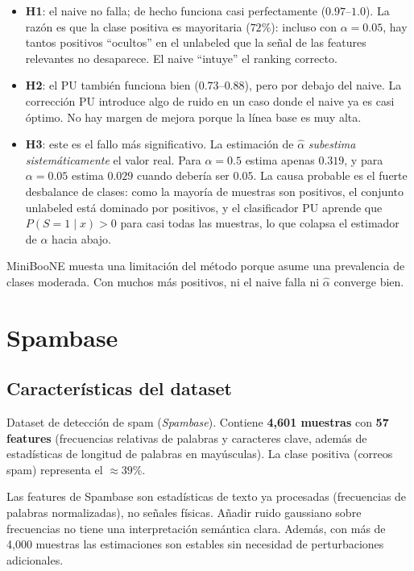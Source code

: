 \documentclass[a4paper,11pt]{article}
\begin{document}
\begin{itemize}
    \item \textbf{H1}: el naive no falla; de hecho funciona casi perfectamente ($0.97$--$1.0$). La razón es que la clase positiva es mayoritaria ($72\%$): incluso con $\alpha = 0.05$, hay tantos positivos ``ocultos'' en el unlabeled que la señal de las features relevantes no desaparece. El naive ``intuye'' el ranking correcto.
    \item \textbf{H2}: el PU también funciona bien ($0.73$--$0.88$), pero por debajo del naive. La corrección PU introduce algo de ruido en un caso donde el naive ya es casi óptimo. No hay margen de mejora porque la línea base es muy alta.
    \item \textbf{H3}: este es el fallo más significativo. La estimación de $\hat{\alpha}$ \emph{subestima sistemáticamente} el valor real. Para $\alpha = 0.5$ estima apenas $0.319$, y para $\alpha = 0.05$ estima $0.029$ cuando debería ser $0.05$. La causa probable es el fuerte desbalance de clases: como la mayoría de muestras son positivos, el conjunto unlabeled está dominado por positivos, y el clasificador PU aprende que $P(S=1 \mid x) > 0$ para casi todas las muestras, lo que colapsa el estimador de $\alpha$ hacia abajo.
\end{itemize}

MiniBooNE muesta una limitación del método porque asume una prevalencia de clases moderada. Con muchos más positivos, ni el naive falla ni $\hat{\alpha}$ converge bien.


\section{Spambase}

\subsection{Características del dataset}

Dataset de detección de spam (\textit{Spambase}). Contiene \textbf{4{,}601 muestras} con \textbf{57 features} (frecuencias relativas de palabras y caracteres clave, además de estadísticas de longitud de palabras en mayúsculas). La clase positiva (correos spam) representa el $\approx 39\%$.

Las features de Spambase son estadísticas de texto ya procesadas (frecuencias de palabras normalizadas), no señales físicas. Añadir ruido gaussiano sobre frecuencias no tiene una interpretación semántica clara. Además, con más de 4{,}000 muestras las estimaciones son estables sin necesidad de perturbaciones adicionales.
\end{document}
